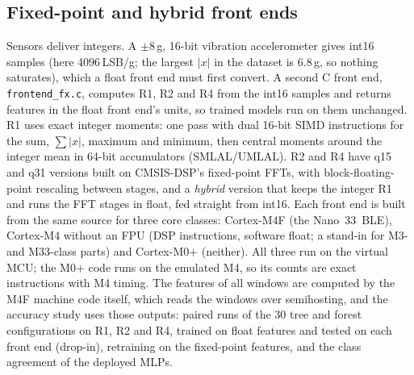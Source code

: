\documentclass[conference]{IEEEtran}
\begin{document}
\subsection{Fixed-point and hybrid front ends}
\label{sec:fxm}
Sensors deliver integers. A $\pm$8\,g, 16-bit vibration accelerometer gives int16 samples (here 4096\,LSB/g; the
largest $|x|$ in the dataset is 6.8\,g, so nothing saturates), which a float front end must first convert. A second C
front end, \texttt{frontend\_fx.c}, computes R1, R2 and R4 from the int16 samples and returns features in the float
front end's units, so trained models run on them unchanged. R1 uses exact integer moments: one pass with dual 16-bit
SIMD instructions for the sum, $\sum|x|$, maximum and minimum, then central moments around the integer mean in 64-bit
accumulators (SMLAL/UMLAL). R2 and R4 have q15 and q31 versions built on CMSIS-DSP's fixed-point FFTs, with
block-floating-point rescaling between stages, and a \emph{hybrid} version that keeps the integer R1 and runs the FFT
stages in float, fed straight from int16. Each front end is built from the same source for three core classes:
Cortex-M4F (the Nano~33~BLE), Cortex-M4 without an FPU (DSP instructions, software float; a stand-in for M3- and
M33-class parts) and Cortex-M0+ (neither). All three run on the virtual MCU; the M0+ code runs on the emulated M4, so
its counts are exact instructions with M4 timing. The features of all \NumWindows{} windows are computed by the M4F
machine code itself, which reads the windows over semihosting, and the accuracy study uses those outputs:
\NumFxRuns{} paired runs of the 30 tree and forest configurations on R1, R2 and R4, trained on float features and
tested on each front end (drop-in), retraining on the fixed-point features, and the class agreement of the deployed
MLPs.
\end{document}
